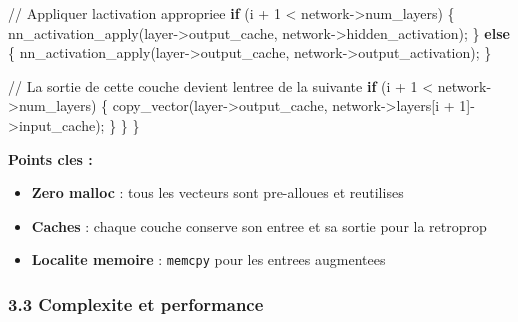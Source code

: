 \documentclass[
  letterpaper,
  DIV=11,
  numbers=noendperiod]{scrartcl}
\newenvironment{Shaded}{\begin{snugshade}}{\end{snugshade}}
\newcommand{\CommentTok}[1]{\textcolor[rgb]{0.37,0.37,0.37}{#1}}
\newcommand{\ControlFlowTok}[1]{\textcolor[rgb]{0.00,0.23,0.31}{\textbf{#1}}}
\newcommand{\DecValTok}[1]{\textcolor[rgb]{0.68,0.00,0.00}{#1}}
\newcommand{\NormalTok}[1]{\textcolor[rgb]{0.00,0.23,0.31}{#1}}
\newcommand{\OperatorTok}[1]{\textcolor[rgb]{0.37,0.37,0.37}{#1}}
\providecommand{\tightlist}{%
  \setlength{\itemsep}{0pt}\setlength{\parskip}{0pt}}
\begin{document}
\begin{Shaded}
\begin{Highlighting}[]
        \CommentTok{// Appliquer l\textquotesingle{}activation appropriee}
        \ControlFlowTok{if} \OperatorTok{(}\NormalTok{i }\OperatorTok{+} \DecValTok{1} \OperatorTok{\textless{}}\NormalTok{ network}\OperatorTok{{-}\textgreater{}}\NormalTok{num\_layers}\OperatorTok{)} \OperatorTok{\{}
\NormalTok{            nn\_activation\_apply}\OperatorTok{(}\NormalTok{layer}\OperatorTok{{-}\textgreater{}}\NormalTok{output\_cache}\OperatorTok{,}\NormalTok{ network}\OperatorTok{{-}\textgreater{}}\NormalTok{hidden\_activation}\OperatorTok{);}
        \OperatorTok{\}} \ControlFlowTok{else} \OperatorTok{\{}
\NormalTok{            nn\_activation\_apply}\OperatorTok{(}\NormalTok{layer}\OperatorTok{{-}\textgreater{}}\NormalTok{output\_cache}\OperatorTok{,}\NormalTok{ network}\OperatorTok{{-}\textgreater{}}\NormalTok{output\_activation}\OperatorTok{);}
        \OperatorTok{\}}

        \CommentTok{// La sortie de cette couche devient l\textquotesingle{}entree de la suivante}
        \ControlFlowTok{if} \OperatorTok{(}\NormalTok{i }\OperatorTok{+} \DecValTok{1} \OperatorTok{\textless{}}\NormalTok{ network}\OperatorTok{{-}\textgreater{}}\NormalTok{num\_layers}\OperatorTok{)} \OperatorTok{\{}
\NormalTok{            copy\_vector}\OperatorTok{(}\NormalTok{layer}\OperatorTok{{-}\textgreater{}}\NormalTok{output\_cache}\OperatorTok{,}\NormalTok{ network}\OperatorTok{{-}\textgreater{}}\NormalTok{layers}\OperatorTok{[}\NormalTok{i }\OperatorTok{+} \DecValTok{1}\OperatorTok{]{-}\textgreater{}}\NormalTok{input\_cache}\OperatorTok{);}
        \OperatorTok{\}}
    \OperatorTok{\}}
\OperatorTok{\}}
\end{Highlighting}
\end{Shaded}

\textbf{Points cles :}
\begin{itemize}
\tightlist
\item \textbf{Zero malloc} : tous les vecteurs sont pre-alloues et reutilises
\item \textbf{Caches} : chaque couche conserve son entree et sa sortie pour la retroprop
\item \textbf{Localite memoire} : \texttt{memcpy} pour les entrees augmentees
\end{itemize}

\subsubsection{3.3 Complexite et performance}\label{complexite-et-performance}
\end{document}
